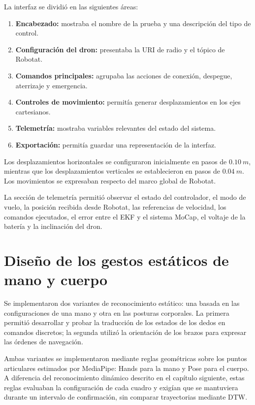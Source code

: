 La interfaz se dividió en las siguientes áreas:

\begin{enumerate}
    \item \textbf{Encabezado:} mostraba el nombre de la prueba y una descripción del tipo de control.
    \item \textbf{Configuración del dron:} presentaba la URI de radio y el tópico de Robotat.
    \item \textbf{Comandos principales:} agrupaba las acciones de conexión, despegue, aterrizaje y emergencia.
    \item \textbf{Controles de movimiento:} permitía generar desplazamientos en los ejes cartesianos.
    \item \textbf{Telemetría:} mostraba variables relevantes del estado del sistema.
    \item \textbf{Exportación:} permitía guardar una representación de la interfaz.
\end{enumerate}

Los desplazamientos horizontales se configuraron inicialmente en pasos de $0.10\ m$, mientras que los desplazamientos verticales se establecieron en pasos de $0.04\ m$. Los movimientos se expresaban respecto del marco global de Robotat.

La sección de telemetría permitió observar el estado del controlador, el modo de vuelo, la posición recibida desde Robotat, las referencias de velocidad, los comandos ejecutados, el error entre el EKF y el sistema MoCap, el voltaje de la batería y la inclinación del dron.

\section{Diseño de los gestos estáticos de mano y cuerpo}

Se implementaron dos variantes de reconocimiento estático: una basada en las configuraciones de una mano y otra en las posturas corporales. La primera permitió desarrollar y probar la traducción de los estados de los dedos en comandos discretos; la segunda utilizó la orientación de los brazos para expresar las órdenes de navegación.

Ambas variantes se implementaron mediante reglas geométricas sobre los puntos articulares estimados por MediaPipe: Hands para la mano y Pose para el cuerpo. A diferencia del reconocimiento dinámico descrito en el capítulo siguiente, estas reglas evaluaban la configuración de cada cuadro y exigían que se mantuviera durante un intervalo de confirmación, sin comparar trayectorias mediante DTW.

